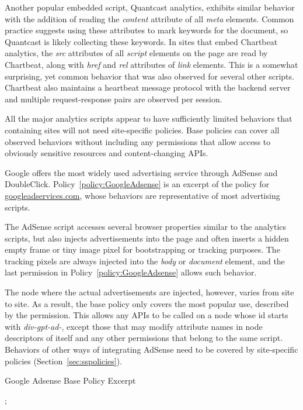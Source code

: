 Another popular embedded script, Quantcast analytics, exhibits similar
behavior with the addition of reading the \emph{content} attribute of
all \emph{meta} elements.  Common practice suggests using these
attributes to mark keywords for the document, so Quantcast is likely
collecting these keywords.  In sites that embed Chartbeat analytics, the
\emph{src} attributes of all \emph{script} elements on the page are read
by Chartbeat, along with \emph{href} and \emph{rel} attributes of
\emph{link} elements.  This is a somewhat surprising, yet common
behavior that was also observed for several other scripts.  Chartbeat also
maintains a heartbeat message protocol with the backend server and
multiple request-response pairs are observed per session.

All the major analytics scripts appear to have sufficiently limited
behaviors that containing sites will not need site-specific policies.
Base policies can cover all observed behaviors without including any
permissions that allow access to ob\-vi\-ous\-ly sensitive resources and
content-changing APIs.

 Google offers the most widely used
advertising service through AdSense and DoubleClick.
Policy~\ref{policy:GoogleAdsense} is an excerpt of the policy for
\url{googleadservices.com}, whose behaviors are representative of most
advertising scripts.

The AdSense script accesses several browser properties similar to the
analytics scripts, but also injects advertisements into the page and
often inserts a hidden empty frame or tiny image pixel for bootstrapping
or tracking purposes.  The tracking pixels are always injected into the
\emph{body} or \emph{document} element, and the last
permission in Policy~\ref{policy:GoogleAdsense} allows such
behavior.

The node where the actual advertisements are injected, however, varies
from site to site.  As a result, the base policy only covers the most
popular use, described by the 
permission. This allows any APIs to be called on a node whose id starts
with \emph{div-gpt-ad-}, except those that may modify attribute names in node
descriptors of itself and any other permissions that belong to the same script.  Behaviors of other ways of integrating AdSense need to be covered by site-specific policies
(Section~\ref{sec:sspolicies}).

\begin{algorithm}[bt]
  \raggedright
  \caption{Google Adsense Base Policy Excerpt}
  \label{policy:GoogleAdsense}\small\raggedright
{};  \\
\vspace*{1ex}
 \\
\vspace*{1ex}
\\
\hspace*{2em} \\
\end{algorithm}

